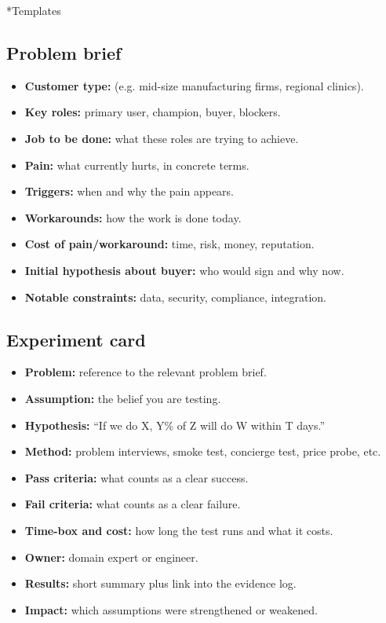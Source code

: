 \documentclass[10pt, a4paper, twocolumn]{article} %
\makeatletter
\let\orig@section\section %
\renewcommand{\section}{%
  \@ifstar{\orig@section*}{\unnumberedsteppingsection}%
}
\newcommand{\unnumberedsteppingsection}[1]{%
  \refstepcounter{section}%
  \orig@section*{#1}%
}
\makeatother
\begin{document}
\newpage

\section*{Templates}

\subsection*{Problem brief}

\begin{itemize}
  \item \textbf{Customer type:} (e.g. mid-size manufacturing firms, regional clinics).
  \item \textbf{Key roles:} primary user, champion, buyer, blockers.
  \item \textbf{Job to be done:} what these roles are trying to achieve.
  \item \textbf{Pain:} what currently hurts, in concrete terms.
  \item \textbf{Triggers:} when and why the pain appears.
  \item \textbf{Workarounds:} how the work is done today.
  \item \textbf{Cost of pain/workaround:} time, risk, money, reputation.
  \item \textbf{Initial hypothesis about buyer:} who would sign and why now.
  \item \textbf{Notable constraints:} data, security, compliance, integration.
\end{itemize}

\subsection*{Experiment card}

\begin{itemize}
  \item \textbf{Problem:} reference to the relevant problem brief.
  \item \textbf{Assumption:} the belief you are testing.
  \item \textbf{Hypothesis:} “If we do X, Y\% of Z will do W within T days.”
  \item \textbf{Method:} problem interviews, smoke test, concierge test, price probe, etc.
  \item \textbf{Pass criteria:} what counts as a clear success.
  \item \textbf{Fail criteria:} what counts as a clear failure.
  \item \textbf{Time-box and cost:} how long the test runs and what it costs.
  \item \textbf{Owner:} domain expert or engineer.
  \item \textbf{Results:} short summary plus link into the evidence log.
  \item \textbf{Impact:} which assumptions were strengthened or weakened.
\end{itemize}
\end{document}
